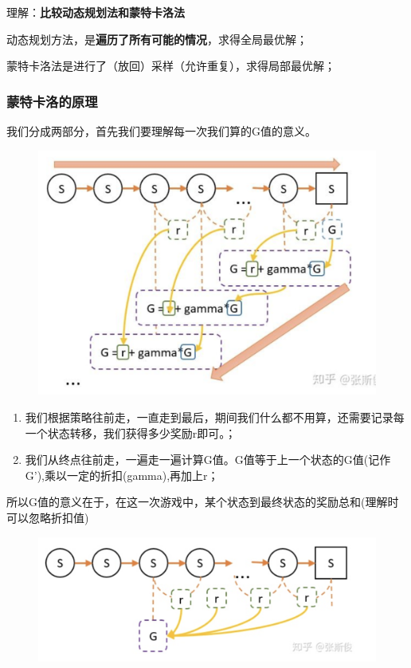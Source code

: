 \documentclass[12pt]{article}
\begin{document}
\begin{framed}
理解：\textbf{比较动态规划法和蒙特卡洛法}

动态规划方法，是\textbf{遍历了所有可能的情况}，求得全局最优解；

蒙特卡洛法是进行了（放回）采样（允许重复），求得局部最优解；
\end{framed}

\subsubsection{蒙特卡洛的原理}
我们分成两部分，首先我们要理解每一次我们算的G值的意义。
\begin{figure}[H]
    \centering
    \includegraphics[width=.6\textwidth]{fig/ReinforcementLearning/RL_MC_Example.png}
\end{figure}

\begin{enumerate}
\setlength{\itemsep}{0pt}
\setlength{\parsep}{0pt}
\setlength{\parskip}{0pt}
    \item 我们根据策略往前走，一直走到最后，期间我们什么都不用算，还需要记录每一个状态转移，我们获得多少奖励r即可。；
    \item 我们从终点往前走，一遍走一遍计算G值。G值等于上一个状态的G值(记作G'),乘以一定的折扣(gamma),再加上r；
\end{enumerate}

所以G值的意义在于，在这一次游戏中，某个状态到最终状态的奖励总和(理解时可以忽略折扣值)
\begin{figure}[H]
    \centering
    \includegraphics[width=.6\textwidth]{fig/ReinforcementLearning/RL_G_Meaning.png}
\end{figure}
\end{document}
